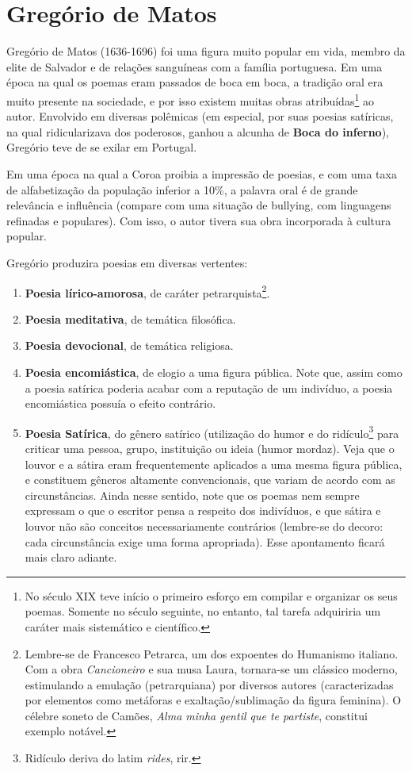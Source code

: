 \documentclass[12pt]{book}
\begin{document}
			\chapter{Gregório de Matos}
			\par Gregório de Matos (1636-1696) foi uma figura muito popular em vida, membro da elite de Salvador e de relações sanguíneas com a família portuguesa. Em uma época na qual os poemas eram passados de boca em boca, a tradição oral era muito presente na sociedade, e por isso existem muitas obras atribuídas\footnote{No século XIX teve início o primeiro esforço em compilar e organizar os seus poemas. Somente no século seguinte, no entanto, tal tarefa adquiriria um caráter mais sistemático e científico.} ao autor. Envolvido em diversas polêmicas (em especial, por suas poesias satíricas, na qual ridicularizava dos poderosos, ganhou a alcunha de \textbf{Boca do inferno}), Gregório teve de se exilar em Portugal.
			\par Em uma época na qual a Coroa proibia a impressão de poesias, e com uma taxa de alfabetização da população inferior a 10\%, a palavra oral é de grande relevância e influência (compare com uma situação de bullying, com linguagens refinadas e populares). Com isso, o autor tivera sua obra incorporada à cultura popular.
			\par Gregório produzira poesias em diversas vertentes:
			\begin{enumerate}
				\item \textbf{Poesia lírico-amorosa}, de caráter petrarquista\footnote{Lembre-se de Francesco Petrarca, um dos expoentes do Humanismo italiano. Com a obra \textit{Cancioneiro} e sua musa Laura, tornara-se um clássico moderno, estimulando a emulação (petrarquiana) por diversos autores (caracterizadas por elementos como metáforas e exaltação/sublimação da figura feminina). O célebre soneto de Camões, \textit{Alma minha gentil que te partiste}, constitui exemplo notável.}.
				\item \textbf{Poesia meditativa}, de temática filosófica.
				\item \textbf{Poesia devocional}, de temática religiosa.
				\item \textbf{Poesia encomiástica}, de elogio a uma figura pública. Note que, assim como a poesia satírica poderia acabar com a reputação de um indivíduo, a poesia encomiástica possuía o efeito contrário.
				\item \textbf{Poesia Satírica}, do gênero satírico (utilização do humor e do ridículo\footnote{Ridículo deriva do latim \textit{rides}, rir.} para criticar uma pessoa, grupo, instituição ou ideia (humor mordaz). Veja que o louvor e a sátira eram frequentemente aplicados a uma mesma figura pública, e constituem gêneros altamente convencionais, que variam de acordo com as circunstâncias. Ainda nesse sentido, note que os poemas nem sempre expressam o que o escritor pensa a respeito dos indivíduos, e que sátira e louvor não são conceitos necessariamente contrários (lembre-se do decoro: cada circunstância exige uma forma apropriada). Esse apontamento ficará mais claro adiante.
			\end{enumerate}
\end{document}

